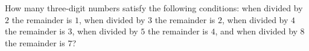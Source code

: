 How many three-digit numbers satisfy the following conditions: when divided by $2$ the remainder is $1$, when divided by $3$ the remainder is $2$, when divided by $4$ the remainder is $3$, when divided by $5$ the remainder is $4$, and when divided by $8$ the remainder is $7$?
